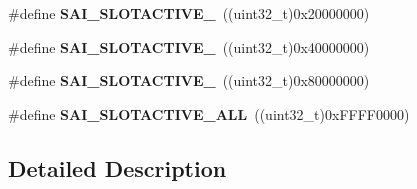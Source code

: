 \begin{DoxyCompactItemize}
\item 
\#define {\bfseries S\+A\+I\+\_\+\+S\+L\+O\+T\+A\+C\+T\+I\+V\+E\+\_}~((uint32\+\_\+t)0x20000000)\hypertarget{group___s_a_i___block___slot___active_ga179fe698ddb946e3e0e210f62facd725}{}\label{group___s_a_i___block___slot___active_ga179fe698ddb946e3e0e210f62facd725}

\item 
\#define {\bfseries S\+A\+I\+\_\+\+S\+L\+O\+T\+A\+C\+T\+I\+V\+E\+\_}~((uint32\+\_\+t)0x40000000)\hypertarget{group___s_a_i___block___slot___active_ga150269f866e241899e3732c7d3429c99}{}\label{group___s_a_i___block___slot___active_ga150269f866e241899e3732c7d3429c99}

\item 
\#define {\bfseries S\+A\+I\+\_\+\+S\+L\+O\+T\+A\+C\+T\+I\+V\+E\+\_}~((uint32\+\_\+t)0x80000000)\hypertarget{group___s_a_i___block___slot___active_ga724a83ca2b7cfc45f70e0c948fd62682}{}\label{group___s_a_i___block___slot___active_ga724a83ca2b7cfc45f70e0c948fd62682}

\item 
\#define {\bfseries S\+A\+I\+\_\+\+S\+L\+O\+T\+A\+C\+T\+I\+V\+E\+\_\+\+A\+LL}~((uint32\+\_\+t)0x\+F\+F\+F\+F0000)\hypertarget{group___s_a_i___block___slot___active_gae26294133dfae63aaedc8c7fae5f4fd4}{}\label{group___s_a_i___block___slot___active_gae26294133dfae63aaedc8c7fae5f4fd4}

\end{DoxyCompactItemize}


\subsection{Detailed Description}
